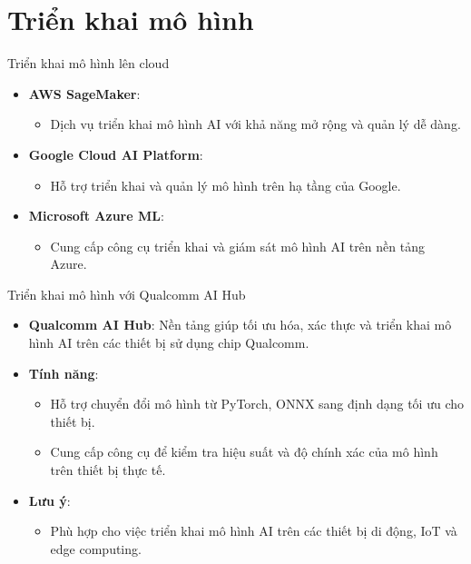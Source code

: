 \documentclass{beamer}
\begin{document}
    
    
\section{Triển khai mô hình}

\begin{frame}{Triển khai mô hình lên cloud}
    \begin{itemize}
        \item \textbf{AWS SageMaker}:
        \begin{itemize}
            \item Dịch vụ triển khai mô hình AI với khả năng mở rộng và quản lý dễ dàng.
        \end{itemize}
        \item \textbf{Google Cloud AI Platform}:
        \begin{itemize}
            \item Hỗ trợ triển khai và quản lý mô hình trên hạ tầng của Google.
        \end{itemize}
        \item \textbf{Microsoft Azure ML}:
        \begin{itemize}
            \item Cung cấp công cụ triển khai và giám sát mô hình AI trên nền tảng Azure.
        \end{itemize}
    \end{itemize}
\end{frame}

\begin{frame}{Triển khai mô hình với Qualcomm AI Hub}
    \begin{itemize}
        \item \textbf{Qualcomm AI Hub}: Nền tảng giúp tối ưu hóa, xác thực và triển khai mô hình AI trên các thiết bị sử dụng chip Qualcomm.
        \item \textbf{Tính năng}:
        \begin{itemize}
            \item Hỗ trợ chuyển đổi mô hình từ PyTorch, ONNX sang định dạng tối ưu cho thiết bị.
            \item Cung cấp công cụ để kiểm tra hiệu suất và độ chính xác của mô hình trên thiết bị thực tế.
        \end{itemize}
        \item \textbf{Lưu ý}:
        \begin{itemize}
            \item Phù hợp cho việc triển khai mô hình AI trên các thiết bị di động, IoT và edge computing.
        \end{itemize}
    \end{itemize}
\end{frame}
\end{document}
